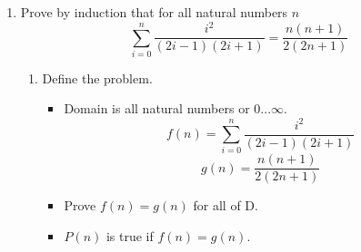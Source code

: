 \documentclass{article}
\begin{document}
\begin{enumerate}
    \clearpage
    \item Prove by induction that for all natural numbers $n$
    $$\sum\limits_{i=0}^{n} \frac{i^{2}}{(2i-1)(2i+1)} = \frac{n(n+1)}{2(2n+1)}$$
    \begin{enumerate}[1.]
        \item Define the problem.
            
        \begin{itemize}
            \item Domain is all natural numbers or $0...\infty$.
            $$f(n) = \sum\limits_{i=0}^{n} \frac{i^{2}}{(2i-1)(2i+1)}$$
            $$g(n) = \frac{n(n+1)}{2(2n+1)}$$
            \item Prove $f(n) = g(n)$ for all of D.
            \item $P(n)$ is true if $f(n) = g(n)$.
            
        \end{itemize}


\end{enumerate}
\end{enumerate}
\end{document}
